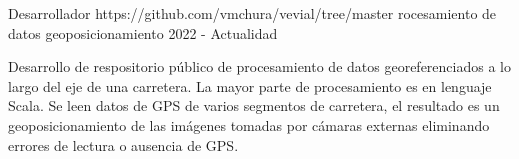 

\begin{cventries}



  \cventry
      {Desarrollador} %
      {https://github.com/vmchura/vevial/tree/master} %
      {rocesamiento de datos geoposicionamiento} %
      {2022 - Actualidad} %
    {
      \begin{cvitems} %
        \item {Desarrollo de respositorio público de procesamiento de datos georeferenciados a lo largo del eje de una carretera. La mayor parte de procesamiento es en lenguaje Scala. Se leen datos de GPS de varios segmentos de carretera, el resultado es un geoposicionamiento de las imágenes tomadas por cámaras externas eliminando errores de lectura o ausencia de GPS.}
      \end{cvitems}
    }
\end{cventries}
